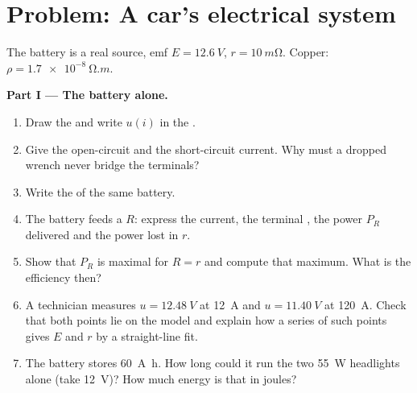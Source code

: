 \section{Problem: A car's electrical system}

\begin{problem}
\label{pb:b1:dc-circuits:1}
The battery is a real source, emf $E = \qty{12.6}{V}$,  $r = \qty{10}{m\ohm}$. Copper: $\rho = \qty{1.7e-8}{\ohm.m}$.

\medskip
\noindent\textbf{Part I --- The battery alone.}
\begin{enumerate}
  \item Draw the  and write $u(i)$ in the .
  \item Give the open-circuit  and the short-circuit current.
        Why must a dropped wrench never bridge the terminals?
  \item Write the  of the same battery.
  \item The battery feeds a  $R$: express the current, the
        terminal , the power $P_R$ delivered and the power lost
        in $r$.
  \item Show that $P_R$ is maximal for $R = r$ and compute that
        maximum. What is the efficiency then?
  \item A technician measures $u = \qty{12.48}{V}$ at \qty{12}{A} and
        $u = \qty{11.40}{V}$ at \qty{120}{A}. Check that both points lie
        on the model and explain how a series of such points gives $E$
        and $r$ by a straight-line fit.
  \item The battery stores \qty{60}{A.h}. How long could it run the
        two \qty{55}{W} headlights alone (take \qty{12}{V})? How much
        energy is that in joules?
\end{enumerate}


\end{problem}
